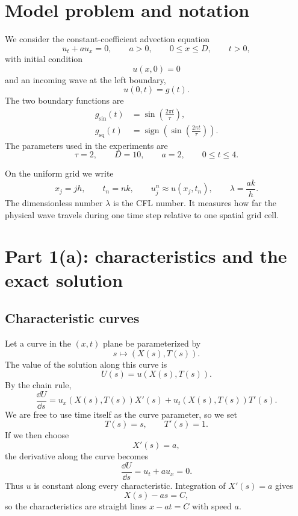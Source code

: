 \section{Model problem and notation}

We consider the constant-coefficient advection equation
\begin{equation}
 u_t+a u_x=0,
 \qquad a>0,
 \qquad 0\leq x\leq D,
 \qquad t>0,
\end{equation}
with initial condition
\begin{equation}
 u(x,0)=0
\end{equation}
and an incoming wave at the left boundary,
\begin{equation}
 u(0,t)=g(t).
\end{equation}
The two boundary functions are
\begin{align}
 g_{\sin}(t)&=\sin\!\left(\frac{2\pi t}{\tau}\right),\\
 g_{\mathrm{sq}}(t)&=\operatorname{sign}\!\left(
 \sin\!\left(\frac{2\pi t}{\tau}\right)\right).
\end{align}
The parameters used in the experiments are
\[
 \tau=2,
 \qquad D=10,
 \qquad a=2,
 \qquad 0\leq t\leq4.
\]

On the uniform grid we write
\begin{equation}
 x_j=jh,
 \qquad t_n=nk,
 \qquad u_j^n\approx u(x_j,t_n),
 \qquad \lambda=\frac{ak}{h}.
\end{equation}
The dimensionless number $\lambda$ is the CFL number. It measures how far the
physical wave travels during one time step relative to one spatial grid cell.

\section{Part 1(a): characteristics and the exact solution}

\subsection{Characteristic curves}

Let a curve in the $(x,t)$ plane be parameterized by
\[
 s\longmapsto (X(s),T(s)).
\]
The value of the solution along this curve is
\[
 U(s)=u(X(s),T(s)).
\]
By the chain rule,
\begin{equation}
 \frac{\dd U}{\dd s}
 =u_x(X(s),T(s))X'(s)+u_t(X(s),T(s))T'(s).
\end{equation}
We are free to use time itself as the curve parameter, so we set
\[
 T(s)=s,
 \qquad T'(s)=1.
\]
If we then choose
\[
 X'(s)=a,
\]
the derivative along the curve becomes
\begin{equation}
 \frac{\dd U}{\dd s}=u_t+a u_x=0.
\end{equation}
Thus $u$ is constant along every characteristic. Integration of $X'(s)=a$
gives
\begin{equation}
 X(s)-as=C,
\end{equation}
so the characteristics are straight lines $x-at=C$ with speed $a$.

